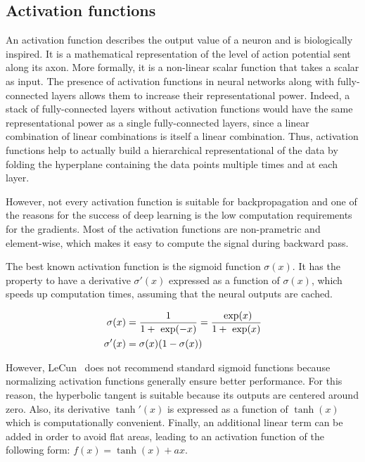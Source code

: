     \subsection{Activation functions}

        An activation function describes the output value of a neuron and is biologically inspired. It is a mathematical representation
        of the level of action potential sent along its axon. More formally, it is a non-linear scalar function that takes a scalar as input.
        The presence of activation functions in neural networks along with fully-connected layers allows them to increase their representational
        power. Indeed, a stack of fully-connected layers without activation functions would have the same representational power as a single
        fully-connected layers, since a linear combination of linear combinations is itself a linear combination. Thus, activation functions
        help to actually build a hierarchical representational of the data by folding the hyperplane containing the data points multiple times
        and at each layer.

        However, not every activation function is suitable for backpropagation and one of the reasons for the success of deep learning is the low
        computation requirements for the gradients. Most of the activation functions are non-prametric and element-wise, which makes it easy
        to compute the signal during backward pass.

        The best known activation function is the sigmoid function $\sigma(x)$.
        It has the property to have a derivative $\sigma'(x)$ expressed as a function of $\sigma(x)$,
        which speeds up computation times, assuming that the neural outputs are cached.

        \begin{equation}
            \begin{split}
                \sigma(x) & = \frac{1}{1 + \text{ exp}(-x)} = \frac{\text{ exp}(x)}{1 + \text{ exp}(x)} \\
                \sigma'(x) & = \sigma(x) (1 - \sigma(x))
            \end{split}
        \end{equation}

        However, LeCun~\cite{efficientBackprop} does not recommend standard sigmoid functions because normalizing
        activation functions generally ensure better performance.
        For this reason, the hyperbolic tangent is suitable because its outputs are centered around zero. 
        Also, its derivative $\tanh'(x)$ is expressed as a function of $\tanh(x)$ which is computationally convenient.
        Finally, an additional linear term can be added in order to
        avoid flat areas, leading to an activation function of the following form: $f(x) = \tanh(x) + ax$.

